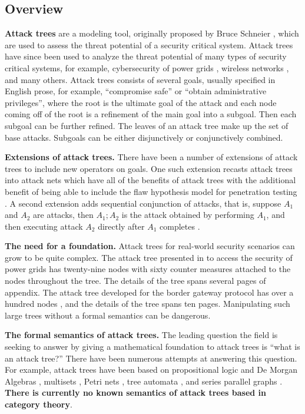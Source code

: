 \begin{full}
\section{Overview}
\label{sec:overview}

\textbf{Attack trees} are a modeling tool, originally proposed by
Bruce Schneier \cite{Schneier:1999}, which are used to assess the
threat potential of a security critical system.  Attack trees have
since been used to analyze the threat potential of many types of
security critical systems, for example, cybersecurity of power grids
\cite{Ten:2007}, wireless networks \cite{Reinhardt:2012}, and many
others.  Attack trees consists of several goals, usually specified in
English prose, for example, ``compromise safe'' or ``obtain
administrative privileges'', where the root is the ultimate goal of
the attack and each node coming off of the root is a refinement of the
main goal into a subgoal.  Then each subgoal can be further refined.
The leaves of an attack tree make up the set of base attacks.  Subgoals
can be either disjunctively or conjunctively combined.

\textbf{Extensions of attack trees.}  There have been a number of
extensions of attack trees to include new operators on goals.  One
such extension recasts attack trees into attack nets which have all of
the benefits of attack trees with the additional benefit of being able
to include the flaw hypothesis model for penetration testing
\cite{McDermott:2001}.  A second extension adds sequential conjunction
of attacks, that is, suppose $A_1$ and $A_2$ are attacks, then
$A_1;A_2$ is the attack obtained by performing $A_1$, and then
executing attack $A_2$ directly after $A_1$ completes
\cite{Jhawar:2015}.

\textbf{The need for a foundation.}  Attack trees for real-world
security scenarios can grow to be quite complex.  The attack tree
presented in \cite{Ten:2007} to access the security of power grids has
twenty-nine nodes with sixty counter measures attached to the nodes
throughout the tree.  The details of the tree spans several pages of
appendix.  The attack tree developed for the border gateway protocol
has over a hundred nodes \cite{Convey:2003}, and the details of the
tree spans ten pages.  Manipulating such large trees without a formal
semantics can be dangerous.

\textbf{The formal semantics of attack trees.} The leading question
the field is seeking to answer by giving a mathematical foundation to
attack trees is ``what is an attack tree?''  There have been numerous
attempts at answering this question.  For example, attack trees have
been based on propositional logic and De Morgan Algebras
\cite{Kordy:2014,Kordy:2012,Pietre-Cambacedes:2010}, multisets
\cite{Mauw:2006}, Petri nets \cite{McDermott:2001}, tree automata
\cite{Camtepe:2007}, and series parallel graphs
\cite{Jhawar:2015}. \textbf{There is currently no known semantics of
  attack trees based in category theory}.


\end{full}
